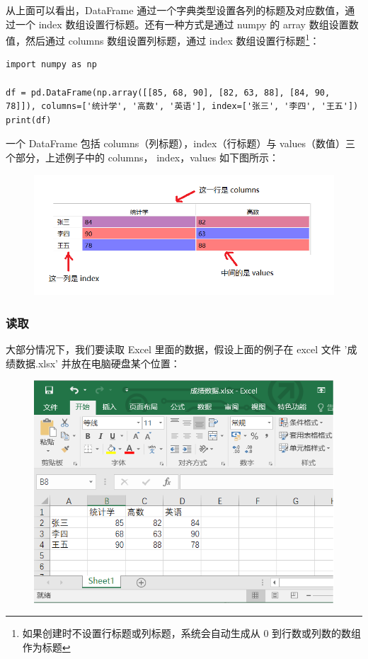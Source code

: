 从上面可以看出，DataFrame 通过一个字典类型设置各列的标题及对应数值，通过一个 index 数组设置行标题。还有一种方式是通过 numpy 的 array 数组设置数值，然后通过 columns 数组设置列标题，通过 index 数组设置行标题\footnote{如果创建时不设置行标题或列标题，系统会自动生成从 0 到行数或列数的数组作为标题}：

\begin{lstlisting}[Language=Python]
import numpy as np

df = pd.DataFrame(np.array([[85, 68, 90], [82, 63, 88], [84, 90, 78]]), columns=['统计学', '高数', '英语'], index=['张三', '李四', '王五'])
print(df)
\end{lstlisting}

一个 DataFrame 包括 columns（列标题），index（行标题）与 values（数值）三个部分，上述例子中的 columns， index，values 如下图所示：

\begin{figure}[!ht]
\centering
  \includegraphics{figure/chapter2/pandas.png}
\end{figure}

\subsubsection{读取}
大部分情况下，我们要读取 Excel 里面的数据，假设上面的例子在 excel 文件 '成绩数据.xlsx' 并放在电脑硬盘某个位置：

\begin{figure}[!ht]
\centering
  \includegraphics[scale=0.7]{figure/chapter2/pandas2.png}
\end{figure}

